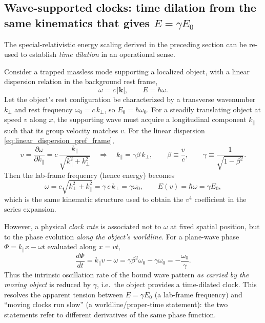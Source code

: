 \documentclass[11pt]{article}
\begin{document}
\subsection{Wave-supported clocks: time dilation from the same kinematics that gives \texorpdfstring{$E=\gamma E_0$}{E=gamma E\_0}}
\label{sec:preferred_frame_time_dilation}

The special-relativistic energy scaling derived in the preceding section can be
re-used to establish \emph{time dilation} in an operational sense.

Consider a trapped massless mode supporting a localized object, with a linear
dispersion relation in the background rest frame,
\begin{equation}
\omega = c\,|\mathbf k|, \qquad E=\hbar\omega.
\label{eq:linear_dispersion_pref_frame}
\end{equation}
Let the object's rest configuration be characterized by a transverse wavenumber
$k_\perp$ and rest frequency $\omega_0=c\,k_\perp$, so $E_0=\hbar\omega_0$.
For a steadily translating object at speed $v$ along $x$, the supporting wave must
acquire a longitudinal component $k_\parallel$ such that its group velocity matches $v$.
For the linear dispersion \eqref{eq:linear_dispersion_pref_frame},
\begin{equation}
v = \frac{\partial \omega}{\partial k_\parallel}
= c\,\frac{k_\parallel}{\sqrt{k_\parallel^2+k_\perp^2}}
\quad\Longrightarrow\quad
k_\parallel = \gamma\beta\,k_\perp,
\qquad
\beta\equiv \frac{v}{c},
\qquad
\gamma \equiv \frac{1}{\sqrt{1-\beta^2}}.
\label{eq:k_parallel_condition_pref_frame}
\end{equation}
Then the lab-frame frequency (hence energy) becomes
\begin{equation}
\omega = c\sqrt{k_\perp^2+k_\parallel^2} = \gamma\,c\,k_\perp = \gamma\omega_0,
\qquad
E(v)=\hbar\omega = \gamma E_0,
\label{eq:E_gamma_pref_frame}
\end{equation}
which is the same kinematic structure used to obtain the $v^4$ coefficient in the
series expansion.

However, a physical \emph{clock rate} is associated not to $\omega$ at fixed spatial
position, but to the phase evolution \emph{along the object's worldline}.
For a plane-wave phase $\Phi = k_\parallel x - \omega t$ evaluated along $x=vt$,
\begin{equation}
\frac{d\Phi}{dt} = k_\parallel v - \omega
= \gamma\beta^2\omega_0 - \gamma\omega_0
= -\frac{\omega_0}{\gamma}.
\label{eq:phase_rate_worldline_pref_frame}
\end{equation}
Thus the intrinsic oscillation rate of the bound wave pattern \emph{as carried by the moving
object} is reduced by $\gamma$, i.e.\ the object provides a time-dilated clock.
This resolves the apparent tension between $E=\gamma E_0$ (a lab-frame frequency)
and ``moving clocks run slow'' (a worldline/proper-time statement): the two statements
refer to different derivatives of the same phase function.
\end{document}
